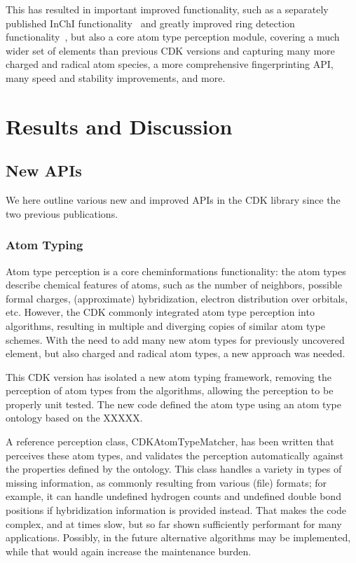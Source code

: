 \documentclass[10pt]{bmcart}
\begin{document}
This has resulted in important improved functionality, such as a separately published
InChI functionality~\cite{Spjuth2013} and greatly improved ring detection functionality~\cite{May2014},
but also a core atom type perception module, covering a much wider set of elements than
previous CDK versions and capturing many more charged and radical atom species,
a more comprehensive fingerprinting API, many speed and stability improvements, and more.

\section*{Results and Discussion}

\subsection*{New APIs}

We here outline various new and improved APIs in the CDK library since the two previous
publications.

  \subsubsection*{Atom Typing}

  Atom type perception is a core cheminformations functionality: the atom types describe
  chemical features of atoms, such as the number of neighbors, possible formal charges,
  (approximate) hybridization, electron distribution over orbitals, etc. However, the
  CDK commonly integrated atom type perception into algorithms, resulting in multiple
  and diverging copies of similar atom type schemes. With the need to add many
  new atom types for previously uncovered element, but also charged and radical atom
  types, a new approach was needed.
  
  This CDK version has isolated a new atom typing framework, removing the perception of
  atom types from the algorithms, allowing the perception to be properly unit tested.
  The new code defined the atom type using an atom type ontology based on the XXXXX.
  
  A reference perception class, CDKAtomTypeMatcher, has been written that perceives these atom types, and
  validates the perception automatically against the properties defined by the ontology.
  This class handles a variety in types of missing information, as commonly resulting
  from various (file) formats; for example, it can handle undefined hydrogen counts
  and undefined double bond positions if hybridization information is provided instead.
  That makes the code complex, and at times slow, but so far shown sufficiently
  performant for many applications. Possibly, in the future
  alternative algorithms may be implemented, while that would again increase the maintenance
  burden.
\end{document}
